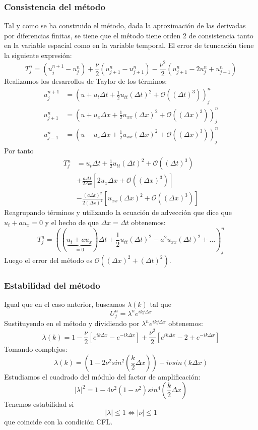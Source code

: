 \documentclass[spanish]{mathnotes}
\begin{document}
	\subsubsection{Consistencia del método}
	Tal y como se ha construido el método, dada la aproximación de las derivadas por diferencias finitas, se tiene que el método tiene orden 2 de consistencia tanto en la variable espacial como en la variable temporal. El error de truncación tiene la siguiente expresión:
	$$T_j^n = (u_j^{n+1}-u_j^n) + \frac{\nu}{2}(u_{j+1}^n-u_{j+1}^n) - \frac{\nu^2}{2}(u_{j+1}^n-2u_j^n+u_{j-1}^n)$$
	Realizamos los desarrollos de Taylor de los términos:
	\begin{align*}
		u_j^{n+1} & = \left(u+u_t\Delta t + \frac{1}{2}u_{tt}(\Delta t)^2 + \mathcal{O}((\Delta t)^3)\right)_j^n\\
		u_{j+1}^n & = \left(u+u_x\Delta x + \frac{1}{2}u_{xx}(\Delta x)^2 + \mathcal{O}((\Delta x)^3)\right)_j^n\\
		u_{j-1}^n & = \left(u-u_x\Delta x + \frac{1}{2}u_{xx}(\Delta x)^2 + \mathcal{O}((\Delta x)^3)\right)_j^n
	\end{align*}
	Por tanto
	\begin{align*}
	T_j^n &= u_t\Delta t + \frac{1}{2}u_{tt}(\Delta t)^2 + \mathcal{O}((\Delta t)^3)\\
	&+\frac{a\Delta t}{2\Delta x}\left[2u_x\Delta x + \mathcal{O}((\Delta x)^3)\right]\\
	&-\frac{(a\Delta t)^2}{2(\Delta x)^2}\left[u_{xx}(\Delta x)^2+\mathcal{O}((\Delta x)^3)\right]
	\end{align*}
	Reagrupando términos y utilizando la ecuación de advección que dice que $u_t + au_x = 0$ y el hecho de que $\Delta x = \Delta t$ obtenemos:
	$$T_j^n = \left((\underbrace{u_t+au_x}_{=0})\Delta t + \frac{1}{2}u_{tt}(\Delta t)^2 -a^2u_{xx}(\Delta t)^2 + \hdots\right)_j^n$$
	Luego el error del método es $\mathcal{O}((\Delta x)^2 +(\Delta t)^2)$.
	
	\subsubsection{Estabilidad del método}
	Igual que en el caso anterior, buscamos $\lambda(k)$ tal que $$U_j^n = \lambda ^n e^{ikj\Delta x}$$
	Sustituyendo en el método y dividiendo por $\lambda^n e^{ikj\Delta x}$ obtenemos:
	$$\lambda(k) = 1 - \frac{\nu}{2}\left[e^{ik\Delta x}-e^{-ik\Delta x}\right]+\frac{\nu^2}{2}\left[e^{ik\Delta x}-2+e^{-ik\Delta x}\right]$$
	Tomando complejos:	
	$$\lambda(k) = \left(1-2\nu^2sin^2\left(\frac{k}{2}\Delta x\right)\right)-i\nu sin(k\Delta x)$$
	Estudiamos el cuadrado del módulo del factor de amplificación:
	$$|\lambda|^2 = 1-4\nu^2(1-\nu^2)sin^4\left(\frac{k}{2}\Delta x\right)$$
	Tenemos estabilidad si 
	$$|\lambda|\le 1 \iff |\nu| \le 1$$
	que coincide con la condición CFL.
\end{document}
